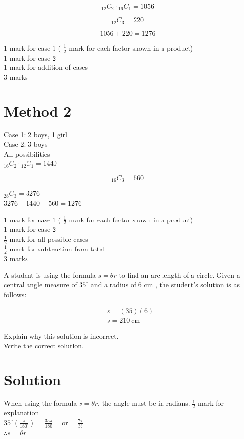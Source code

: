 \documentclass[10pt]{article}
\begin{document}
$$
{ }_{12} C_{2} \cdot{ }_{16} C_{1}=1056
$$

$$
{ }_{12} C_{3}=220
$$

$$
1056+220=1276
$$

1 mark for case 1 ( $\frac{1}{2}$ mark for each factor shown in a product)\\
1 mark for case 2\\
1 mark for addition of cases\\
3 marks

\section*{Method 2}
Case 1: 2 boys, 1 girl\\
Case 2: 3 boys\\
All possibilities\\
${ }_{16} C_{2} \cdot{ }_{12} C_{1}=1440$

$$
{ }_{16} C_{3}=560
$$

${ }_{28} C_{3}=3276$\\
$3276-1440-560=1276$

1 mark for case 1 ( $\frac{1}{2}$ mark for each factor shown in a product)\\
1 mark for case 2\\
$\frac{1}{2}$ mark for all possible cases\\
$\frac{1}{2}$ mark for subtraction from total\\
3 marks

A student is using the formula $s=\theta r$ to find an arc length of a circle. Given a central angle measure of $35^{\circ}$ and a radius of 6 cm , the student's solution is as follows:

$$
\begin{aligned}
& s=(35)(6) \\
& s=210 \mathrm{~cm}
\end{aligned}
$$

Explain why this solution is incorrect.\\
Write the correct solution.

\section*{Solution}
When using the formula $s=\theta r$, the angle must be in radians. $\frac{1}{2}$ mark for explanation\\
$35^{\circ}\left(\frac{\pi}{180^{\circ}}\right)=\frac{35 \pi}{180} \quad$ or $\quad \frac{7 \pi}{36}$\\
$\therefore s=\theta r$
\end{document}
